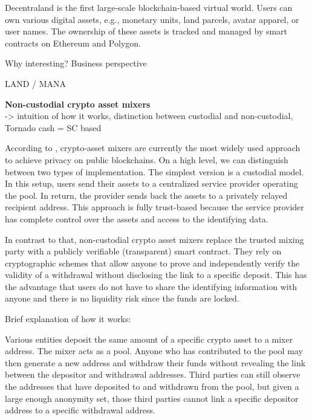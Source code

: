 \documentclass[12pt,a4paper,titlepage,oneside,english]{article}
\begin{document}
Decentraland is the first large-scale blockchain-based virtual world. Users can own various digital assets, e.g., monetary units, land parcels, avatar apparel, or user names. The ownership of these assets is tracked and managed by smart contracts on Ethereum and Polygon. \citep{goldbergschaer}

 Why interesting? Business perspective
 
 
LAND / MANA
 

\textbf{Non-custodial crypto asset mixers} \\

-> intuition of how it works,  distinction between custodial and non-custodial, Tornado cash = SC based

According to \cite{nadler2023tornado}, crypto-asset mixers are currently the most widely used approach to achieve privacy on public blockchains. On a high level, we can distinguish between two types of implementation. The simplest version is a custodial model. In this setup, users send their assets to a centralized service provider operating the pool. In return, the provider sends back the assets to a privately relayed recipient address. This approach is fully trust-based because the service provider has complete control over the assets and access to the identifying data. 

In contrast to that, non-custodial crypto asset mixers replace the trusted mixing party with a publicly verifiable (transparent) smart contract. They rely on cryptographic schemes that allow anyone to prove and independently verify the validity of a withdrawal without disclosing the link to a specific deposit. This has the advantage that users do not have to share the identifying information with anyone and there is no liquidity risk since the funds are locked.

Brief explanation of how it works:

Various entities deposit the same amount of a specific crypto asset to a mixer address. The mixer acts as a pool. Anyone who has contributed to the pool may then generate a new address and withdraw their funds without revealing the link between the depositor and withdrawal addresses. Third parties can still observe the addresses that have deposited to and withdrawn from the pool, but given a large enough anonymity set, those third parties cannot link a specific depositor address to a specific withdrawal address.
\end{document}
